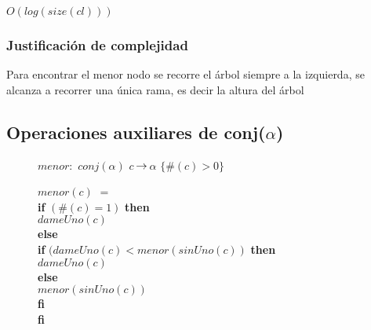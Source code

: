 {$O(log(size(cl)))$}

\subsubsection*{Justificación de complejidad}{
	Para encontrar el menor nodo se recorre el árbol siempre a la izquierda, se alcanza a recorrer una única rama, 
	es decir la altura del árbol
}

{}

\subsection{Operaciones auxiliares de conj($\alpha$)}


\begin{description} 
\item[] $menor:$ $conj(\alpha)$ $c$ $\!\rightarrow\!$ $\alpha$ \setlength{\parindent}{1cm} \indent $\{ \#(c)>0 \}$

\item[] $menor(c)$ $=$ 
	\setlength{\parindent}{1cm}\\ \textbf{if} $(\#(c) = 1)$ \textbf{then} 
		\\ \indent$dameUno(c)$
	\\ \textbf{else} 
		\\\indent  \textbf{if}  $(dameUno(c) < menor(sinUno(c))$ \textbf{then} 
			\\\indent \indent $dameUno(c)$
		\\\indent  \textbf{else} 
			\\\indent \indent$menor(sinUno(c))$
		\\\indent  \textbf{fi} 
	\\  \textbf{fi} 
\end{description}
